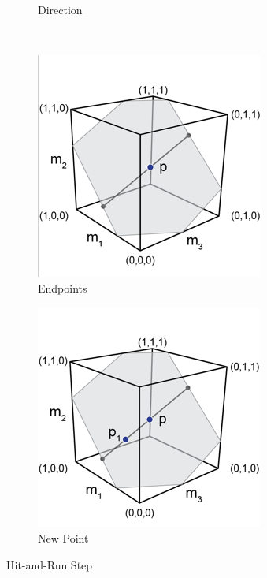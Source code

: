 \begin{figure}
\begin{subfigure}[b]{0.25\textwidth}
                \caption{Direction}
      					\label{fig_hr2}
        \end{subfigure} \\
        \begin{subfigure}[b]{0.25\textwidth}
                \includegraphics[width=\textwidth]{HR4.png}
                 \caption{Endpoints}
      					\label{fig_hr3}
        \end{subfigure} \hspace{0.5cm}
        \begin{subfigure}[b]{0.25\textwidth}
                \includegraphics[width=\textwidth]{HR5.png}
                \caption{New Point}
      				 \label{fig_hr4}
        \end{subfigure}
        \caption{Hit-and-Run Step}\label{fig:animals}
\end{figure}

